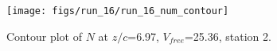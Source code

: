 \begin{figure}[H]
\centering
\texttt{[image: figs/run\_16/run\_16\_num\_contour]}
\caption{Contour plot of $N$ at $z/c$=6.97, $V_{free}$=25.36, station 2.}
\label{fig:run_16_num_contour}
\end{figure}


